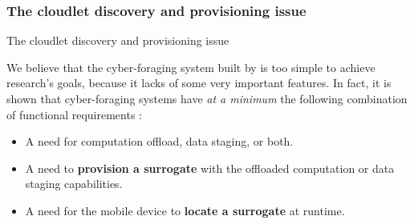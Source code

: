 \documentclass[10pt]{beamer}
\begin{document}
\subsubsection{The cloudlet discovery and provisioning issue}
\begin{frame}{The cloudlet discovery and provisioning issue} 

We believe that the cyber-foraging system built by \citet{MSAReport} is too simple to achieve research's goals, because it lacks of some very important features. In fact, it is shown that cyber-foraging systems have \textit{at a minimum} the following combination of functional requirements \cite{DecisionModel}:

\begin{itemize}

\item  A need for computation offload, data staging, or both.
\item  A need to \textbf{provision a surrogate} with the offloaded computation or data staging capabilities.
\item  A need for the mobile device to \textbf{locate a surrogate} at runtime.

\end{itemize}

\end{frame} 
\end{document}
